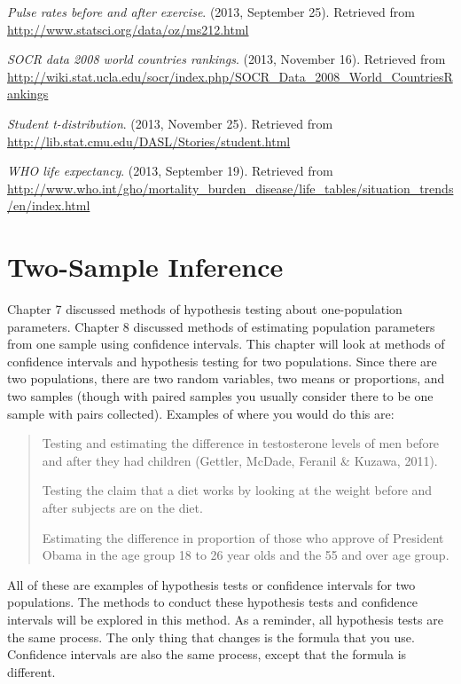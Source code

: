 \documentclass[]{book}
\begin{document}
\emph{Pulse rates before and after exercise}. (2013, September 25). Retrieved
from \url{http://www.statsci.org/data/oz/ms212.html}

\emph{SOCR data 2008 world countries rankings}. (2013, November 16).
Retrieved from
\url{http://wiki.stat.ucla.edu/socr/index.php/SOCR_Data_2008_World_CountriesRankings}

\emph{Student t-distribution}. (2013, November 25). Retrieved from
\url{http://lib.stat.cmu.edu/DASL/Stories/student.html}

\emph{WHO life expectancy}. (2013, September 19). Retrieved from
\url{http://www.who.int/gho/mortality_burden_disease/life_tables/situation_trends/en/index.html}

\hypertarget{two-sample-inference}{%
\chapter{Two-Sample Inference}\label{two-sample-inference}}

Chapter 7 discussed methods of hypothesis testing about one-population parameters. Chapter 8 discussed methods of estimating population parameters from one sample using confidence intervals. This chapter will look at methods of confidence intervals and hypothesis testing for two populations. Since there are two populations, there are two random variables, two means or proportions, and two samples (though with paired samples you usually consider there to be one sample with pairs collected). Examples of where you would do this are:

\begin{quote}
Testing and estimating the difference in testosterone levels of men
before and after they had children (Gettler, McDade, Feranil \& Kuzawa,
2011).

Testing the claim that a diet works by looking at the weight before
and after subjects are on the diet.

Estimating the difference in proportion of those who approve of
President Obama in the age group 18 to 26 year olds and the 55 and
over age group.
\end{quote}

All of these are examples of hypothesis tests or confidence intervals for two populations. The methods to conduct these hypothesis tests and confidence intervals will be explored in this method. As a reminder, all hypothesis tests are the same process. The only thing that changes is the formula that you use. Confidence intervals are also the same process, except that the formula is different.
\end{document}
